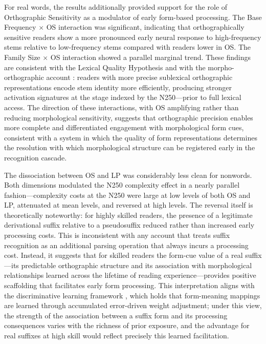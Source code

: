 	For real words, the results additionally provided support for the role of Orthographic Sensitivity as a modulator of early form-based processing. The Base Frequency $\times$ OS interaction was significant, indicating that orthographically sensitive readers show a more pronounced early neural response to high-frequency stems relative to low-frequency stems compared with readers lower in OS. The Family Size $\times$ OS interaction showed a parallel marginal trend. These findings are consistent with the Lexical Quality Hypothesis \citep{CITATION} and with the morpho-orthographic account \citep{CITATION}: readers with more precise sublexical orthographic representations encode stem identity more efficiently, producing stronger activation signatures at the stage indexed by the N250—prior to full lexical access. The direction of these interactions, with OS amplifying rather than reducing morphological sensitivity, suggests that orthographic precision enables more complete and differentiated engagement with morphological form cues, consistent with a system in which the quality of form representations determines the resolution with which morphological structure can be registered early in the recognition cascade.
	
	The dissociation between OS and LP was considerably less clean for nonwords. Both dimensions modulated the N250 complexity effect in a nearly parallel fashion—complexity costs at the N250 were large at low levels of both OS and LP, attenuated at mean levels, and reversed at high levels. The reversal itself is theoretically noteworthy: for highly skilled readers, the presence of a legitimate derivational suffix relative to a pseudosuffix reduced rather than increased early processing costs. This is inconsistent with any account that treats suffix recognition as an additional parsing operation that always incurs a processing cost. Instead, it suggests that for skilled readers the form-cue value of a real suffix—its predictable orthographic structure and its association with morphological relationships learned across the lifetime of reading experience—provides positive scaffolding that facilitates early form processing. This interpretation aligns with the discriminative learning framework \citep{CITATION}, which holds that form-meaning mappings are learned through accumulated error-driven weight adjustment; under this view, the strength of the association between a suffix form and its processing consequences varies with the richness of prior exposure, and the advantage for real suffixes at high skill would reflect precisely this learned facilitation.
	
